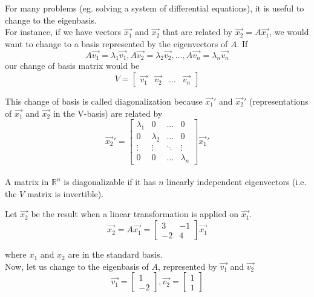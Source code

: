 \begin{enumerate}
\bigskip

\begin{adjustwidth}{-20pt}{0pt}

For many problems (eg. solving a system of differential equations), it is useful to change to the eigenbasis. \\
For instance, if we have vectors $\vec{x_1}$ and $\vec{x_2}$ that are related by $\vec{x_2} = A \vec{x_1}$, we would want to change to a basis represented by the eigenvectors of $A$.
If $$A \vec{v_1} = \lambda_1 \vec{v_1}, A \vec{v_2} = \lambda_2 \vec{v_2}, \dots, A\vec{v_n} = \lambda_n \vec{v_n} $$
our change of basis matrix would be
$$ V =
\begin{bmatrix}
\vec{v_1} & \vec{v_2} & \dots & \vec{v_n}
\end{bmatrix}
$$

This change of basis is called diagonalization because $\vec{x_1}'$ and $\vec{x_2}'$ (representations of $\vec{x_1}$ and $\vec{x_2}$ in the V-basis) are related by
$$ \vec{x_2}' =
\begin{bmatrix}
\lambda_1 & 0 & \dots & 0 \\
0 & \lambda_2 & \dots & 0 \\
\vdots & \vdots & \ddots & \vdots \\
0 & 0 & \dots & \lambda_n
\end{bmatrix} \vec{x_1}'
$$ \\
A matrix in $\mathbb{R}^{n}$ is diagonalizable if it has $n$ linearly independent eigenvectors (i.e. the $V$ matrix is invertible).

\end{adjustwidth}

\bigskip

\qitem Let $\vec{x_2}$ be the result when a linear transformation is applied on $\vec{x_1}$.
$$\vec{x_2} = A \vec{x_1} =
\begin{bmatrix}
3 & -1 \\
-2 & 4
\end{bmatrix}
\vec{x_1}
$$

where $x_1$ and $x_2$ are in the standard basis. \\
Now, let us change to the eigenbasis of $A$, represented by $\vec{v_1}$ and $\vec{v_2}$
$$
\vec{v_1} =
\begin{bmatrix}
1 \\
-2
\end{bmatrix},
\vec{v_2} =
\begin{bmatrix}
1 \\
1
\end{bmatrix}
$$


\end{enumerate}
